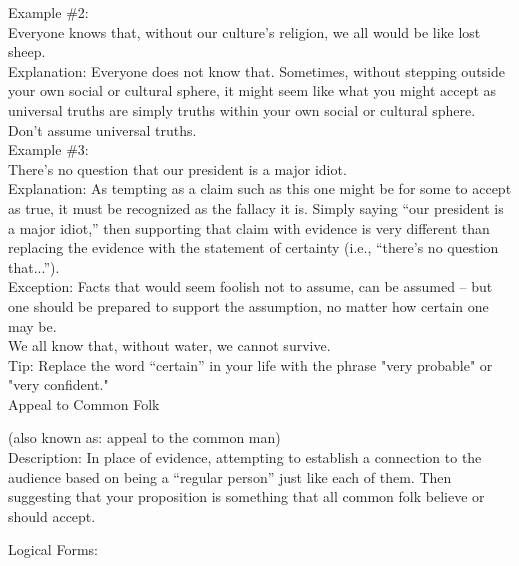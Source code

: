 \documentclass[a4paper,12pt,single,pdftex]{scrartcl}
\begin{document}
    
      Example \#2:
    \\

    
      Everyone knows that, without our culture's religion, we all would be like lost sheep.
    \\

    
      Explanation: Everyone does not know that.  Sometimes, without stepping outside your own social or cultural sphere, it might seem like what you might accept as universal truths are simply truths within your own social or cultural sphere.  Don’t assume universal truths.
    \\

    
      Example \#3:
    \\

    
      There’s no question that our president is a major idiot.
    \\

    
      Explanation: As tempting as a claim such as this one might be for some to accept as true, it must be recognized as the fallacy it is. Simply saying “our president is a major idiot,” then supporting that claim with evidence is very different than replacing the evidence with the statement of certainty (i.e., “there’s no question that...”).
    \\

    
      Exception: Facts that would seem foolish not to assume, can be assumed -- but one should be prepared to support the assumption, no matter how certain one may be.
    \\

    
      We all know that, without water, we cannot survive.
    \\

    
      Tip: Replace the word “certain” in your life with the phrase "very probable" or "very confident."
    \\

  

Appeal to Common Folk
    
      (also known as: appeal to the common man)
    \\

  
    Description: In place of evidence, attempting to establish a connection to the audience based on being a “regular person” just like each of them.  Then suggesting that your proposition is something that all common folk believe or should accept.

    
      Logical Forms:
    \\
\end{document}
